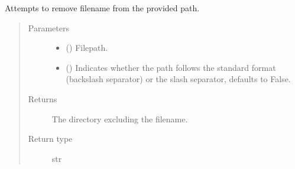 \documentclass[letterpaper,10pt,english]{sphinxmanual}
\begin{document}
\begin{fulllineitems}
\label{\detokenize{code:code_utils.utils.remove_filename_from_path}}
Attempts to remove filename from the provided path.
\begin{quote}\begin{description}
\item[{Parameters}] \leavevmode\begin{itemize}
\item {} 
 () \textendash{} Filepath.

\item {} 
 (\sphinxstyleliteralemphasis{\sphinxupquote{, }}) \textendash{} Indicates whether the path follows the standard
format (backslash separator) or the slash separator, defaults to False.

\end{itemize}

\item[{Returns}] \leavevmode
The directory excluding the filename.

\item[{Return type}] \leavevmode
str

\end{description}\end{quote}

\end{fulllineitems}

\end{document}
